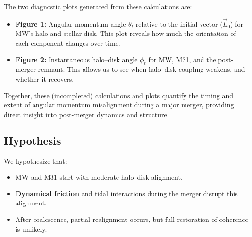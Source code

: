 \documentclass[twocolumn]{aastex631}
\begin{document}
The two diagnostic plots generated from these calculations are:
\begin{itemize}
    \item \textbf{Figure 1:} Angular momentum angle $\theta_t$ relative to the initial vector ($\vec{L}_0$) for MW’s halo and stellar disk. This plot reveals how much the orientation of each component changes over time.
    \item \textbf{Figure 2:} Instantaneous halo–disk angle $\phi_t$ for MW, M31, and the post-merger remnant. This allows us to see when halo–disk coupling weakens, and whether it recovers.
\end{itemize}

Together, these (incompleted) calculations and plots quantify the timing and extent of angular momentum misalignment during a major merger, providing direct insight into post-merger dynamics and structure.

\subsection{Hypothesis}

We hypothesize that:
\begin{itemize}
    \item MW and M31 start with moderate halo–disk alignment.
    \item \textbf{Dynamical friction} and tidal interactions during the merger disrupt this alignment.
    \item After coalescence, partial realignment occurs, but full restoration of coherence is unlikely.
\end{itemize}



\end{document}
